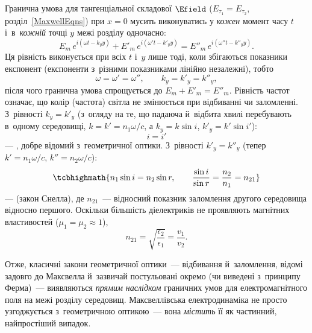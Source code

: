 Гранична умова для тангенціальної складової $\Efield$ ($E_{\tau_1}=E_{\tau_2}$, розділ~\ref{MaxwellEqns}) при $x=0$ мусить виконуватись у
\emph{кожен} момент часу $t$ і~в~\emph{кожній} точці $y$ межі розділу одночасно:
\begin{equation*}
	E_m\, e^{i(\omega t-k_yy)} + E'_m\, e^{i(\omega' t-k'_yy)} = E''_m\, e^{i(\omega'' t-k''_yy)}.
\end{equation*}
Ця рівність виконується при всіх $t$ і~$y$ лише тоді, коли збігаються показники експонент (експоненти з~різними показниками лінійно
незалежні), тобто
\begin{equation}\label{eq:BoundaryConditionE}
	\omega = \omega' = \omega'', \qquad k_y = k'_y = k''_y,
\end{equation}
після чого гранична умова спрощується до $E_m + E'_m = E''_m$. Рівність частот означає, що колір (частота) світла не змінюється при відбиванні
чи заломленні. З~рівності $k_y = k'_y$ (з~огляду на те, що падаюча й~відбита хвилі перебувають в~одному середовищі, $k=k'=n_1\omega/c$, а
$k_y = k\sin i$, $k'_y=k'\sin i'$):
\begin{equation}\label{eq:SnellReflection}
	i = i'
\end{equation}
--- , добре відомий з~геометричної оптики. З~рівності $k'_y=k''_y$ (тепер $k'=n_1\omega/c$, $k''=n_2\omega/c$):
\begin{equation}\label{eq:SnellRefraction}
	\tcbhighmath{
		n_1\sin i = n_2\sin r, \qquad \frac{\sin i}{\sin r} = \frac{n_2}{n_1} = n_{21}
	}
\end{equation}
---  (закон Снелла), де $n_{21}$~--- відносний показник заломлення другого середовища відносно першого. Оскільки
більшість діелектриків не проявляють магнітних властивостей ($\mu_1=\mu_2\approx1$),
\begin{equation}\label{eq:RelativeIndex}
	n_{21} = \sqrt{\frac{\epsilon_2}{\epsilon_1}} = \frac{v_1}{v_2}.
\end{equation}

Отже, класичні закони геометричної оптики~--- відбивання й~заломлення, відомі задовго до Максвелла й~зазвичай постульовані окремо (чи
виведені з~принципу Ферма)~--- виявляються \emph{прямим наслідком} граничних умов для електромагнітного поля на межі розділу середовищ.
Максвеллівська електродинаміка не просто узгоджується з~геометричною оптикою~--- вона \emph{містить} її як частинний, найпростіший випадок.

